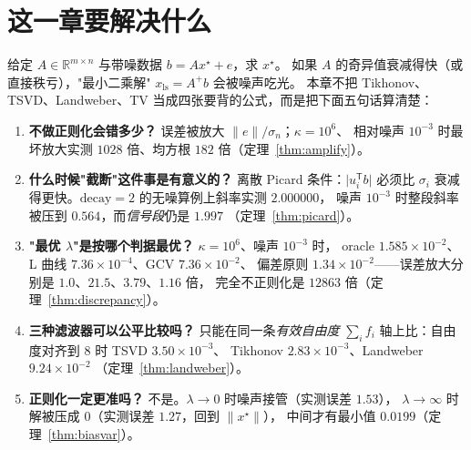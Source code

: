 

\section{这一章要解决什么}

给定 $A\in\mathbb{R}^{m\times n}$ 与带噪数据 $b=Ax^\star+e$，求 $x^\star$。
如果 $A$ 的奇异值衰减得快（或直接秩亏），"最小二乘解" $x_{\mathrm{ls}}=A^{+}b$ 会被噪声吃光。
本章不把 Tikhonov、TSVD、Landweber、TV 当成四张要背的公式，而是把下面五句话算清楚：

\begin{enumerate}
  \item \textbf{不做正则化会错多少？} 误差被放大 $\lVert e\rVert/\sigma_n$；$\kappa=10^6$、
        相对噪声 $10^{-3}$ 时最坏放大实测 $1028$ 倍、均方根 $182$ 倍（定理~\ref{thm:amplify}）。
  \item \textbf{什么时候"截断"这件事是有意义的？} 离散 Picard 条件：$\lvert u_i^{\mathsf T}b\rvert$
        必须比 $\sigma_i$ 衰减得更快。$\mathrm{decay}=2$ 的无噪算例上斜率实测 $2.000000$，
        噪声 $10^{-3}$ 时整段斜率被压到 $0.564$，而\emph{信号段}仍是 $1.997$
        （定理~\ref{thm:picard}）。
  \item \textbf{"最优 $\lambda$"是按哪个判据最优？} $\kappa=10^6$、噪声 $10^{-3}$ 时，
        oracle $1.585\times10^{-2}$、L 曲线 $7.36\times10^{-4}$、GCV $7.36\times10^{-2}$、
        偏差原则 $1.34\times10^{-2}$——误差放大分别是 $1.0$、$21.5$、$3.79$、$1.16$ 倍，
        完全不正则化是 $12863$ 倍（定理~\ref{thm:discrepancy}）。
  \item \textbf{三种滤波器可以公平比较吗？} 只能在同一条\emph{有效自由度}
        $\sum_i f_i$ 轴上比：自由度对齐到 $8$ 时 TSVD $3.50\times10^{-3}$、
        Tikhonov $2.83\times10^{-3}$、Landweber $9.24\times10^{-2}$
        （定理~\ref{thm:landweber}）。
  \item \textbf{正则化一定更准吗？} 不是。$\lambda\to0$ 时噪声接管（实测误差 $1.53$），
        $\lambda\to\infty$ 时解被压成 $0$（实测误差 $1.27$，回到 $\lVert x^\star\rVert$），
        中间才有最小值 $0.0199$（定理~\ref{thm:biasvar}）。
\end{enumerate}

